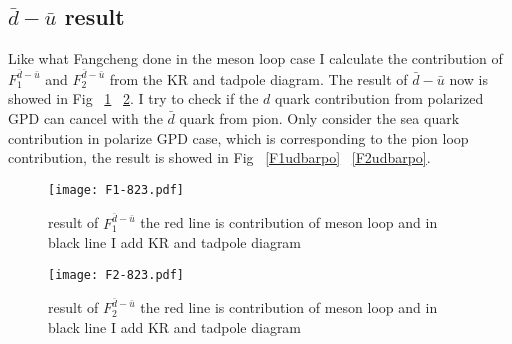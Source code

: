 \documentclass[preprintnumbers,prd,superscriptaddress,preprint]{revtex4-1}
\begin{document}
	\subsection{$\bar{d}-\bar{u}$ result}
	Like what Fangcheng done in the meson loop case I calculate the contribution of $F_{1}^{\bar{d}-\bar{u}}$ and $F_{2}^{\bar{d}-\bar{u}}$ from the KR and tadpole diagram. 
	The result of $\bar{d}-\bar{u}$ now is showed in Fig ~\ref{F1udbar} ~\ref{F2udbar}.
	I try to check if the $d$ quark contribution from polarized GPD can cancel with the $\bar{d}$ quark from pion. Only consider the sea quark contribution in polarize GPD case, which is corresponding to the pion loop contribution, the result is showed in Fig ~\ref{F1udbarpo} ~\ref{F2udbarpo}.
	\begin{figure}[h]
		\begin{center}
			\texttt{[image: F1-823.pdf]}
			\caption{result of $F^{\bar{d}-\bar{u}}_{1}$ the red line is contribution of meson loop and in black line I add KR and tadpole diagram} 
			\label{F1udbar}
		\end{center}
	\end{figure}
	\begin{figure}[h]
		\begin{center}
			\texttt{[image: F2-823.pdf]}
			\caption{result of $F^{\bar{d}-\bar{u}}_{2
				}$ the red line is contribution of meson loop and in black line I add KR and tadpole diagram} 
			\label{F2udbar}
		\end{center}
	\end{figure} 
	
\end{document}
